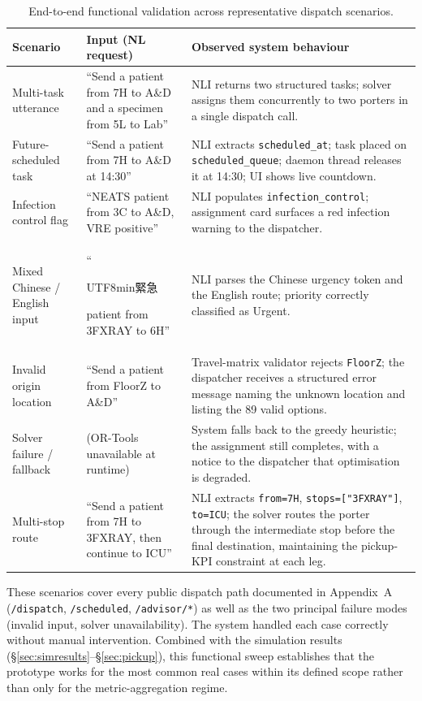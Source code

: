 \documentclass[12pt,a4paper]{article}
\begin{document}
\begin{table}[H]
\centering
\caption{End-to-end functional validation across representative dispatch scenarios.}
\label{tab:edgecases}
\begin{tabular}{p{4.4cm}p{5.0cm}p{4.6cm}}
\toprule
\textbf{Scenario} & \textbf{Input (NL request)} & \textbf{Observed system behaviour} \\
\midrule
Multi-task utterance &
``Send a patient from 7H to A\&D and a specimen from 5L to Lab'' &
NLI returns two structured tasks; solver assigns them concurrently to two porters in a single dispatch call. \\[4pt]
Future-scheduled task &
``Send a patient from 7H to A\&D at 14:30'' &
NLI extracts \texttt{scheduled\_at}; task placed on \texttt{scheduled\_queue}; daemon thread releases it at 14:30; UI shows live countdown. \\[4pt]
Infection control flag &
``NEATS patient from 3C to A\&D, VRE positive'' &
NLI populates \texttt{infection\_control}; assignment card surfaces a red infection warning to the dispatcher. \\[4pt]
Mixed Chinese / English input &
``\begin{CJK}{UTF8}{min}緊急\end{CJK} patient from 3FXRAY to 6H'' &
NLI parses the Chinese urgency token and the English route; priority correctly classified as Urgent. \\[4pt]
Invalid origin location &
``Send a patient from FloorZ to A\&D'' &
Travel-matrix validator rejects \texttt{FloorZ}; the dispatcher receives a structured error message naming the unknown location and listing the 89 valid options. \\[4pt]
Solver failure / fallback &
(OR-Tools unavailable at runtime) &
System falls back to the greedy heuristic; the assignment still completes, with a notice to the dispatcher that optimisation is degraded. \\[4pt]
Multi-stop route &
``Send a patient from 7H to 3FXRAY, then continue to ICU'' &
NLI extracts \texttt{from=7H}, \texttt{stops=["3FXRAY"]}, \texttt{to=ICU}; the solver routes the porter through the intermediate stop before the final destination, maintaining the pickup-KPI constraint at each leg. \\
\bottomrule
\end{tabular}
\end{table}

These scenarios cover every public dispatch path documented in Appendix~A (\texttt{/dispatch}, \texttt{/scheduled}, \texttt{/advisor/*}) as well as the two principal failure modes (invalid input, solver unavailability). The system handled each case correctly without manual intervention. Combined with the simulation results (\S\ref{sec:simresults}--\S\ref{sec:pickup}), this functional sweep establishes that the prototype works for the most common real cases within its defined scope rather than only for the metric-aggregation regime.
\end{document}
